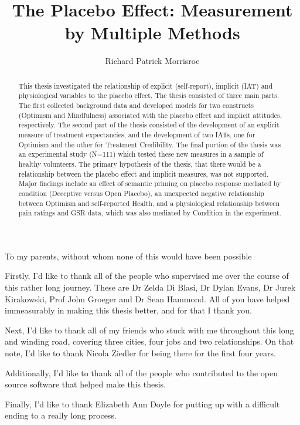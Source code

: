 \documentclass[apsych,phd]{uccthesis}
\title{The Placebo Effect: Measurement by Multiple Methods}
\author[99473437]{Richard Patrick Morrisroe}
\begin{document}


\maketitle





\begin{dedication}
To my parents, without whom none of this would have been possible
\end{dedication}

\begin{abstract}
  This thesis investigated the relationship of explicit (self-report), implicit (IAT) and physiological variables to the placebo effect. The thesis consisted of three main parts. The first collected background data and developed models for two constructs (Optimism and Mindfulness) associated with the placebo effect and implicit attitudes, respectively. The second part of the thesis consisted of the development of an explicit measure of treatment expectancies, and the development of two IATs, one for Optimism and the other for Treatment Credibility. The final portion of the thesis was an experimental study (N=111) which tested these new measures in a sample of healthy volunteers. The primary hypothesis of the thesis, that there would be a relationship between the placebo effect and implicit measures, was not supported. Major findings include an effect of semantic priming on placebo response mediated by condition (Deceptive versus Open Placebo), an unexpected negative relationship between Optimism and self-reported Health, and a physiological relationship between pain ratings and GSR data, which was also mediated by Condition in the experiment. 
\end{abstract}

\begin{acknowledgements}
  Firstly, I'd like to thank all of the people who supervised me over the course of this rather long journey. These are Dr Zelda Di Blasi, Dr Dylan Evans, Dr Jurek Kirakowski, Prof John Groeger and Dr Sean Hammond. All of you have helped immeasurably in making this thesis better, and for that I thank you. 

Next, I'd like to thank all of my friends who stuck with me throughout this long and winding road, covering three cities, four jobs and two relationships. On that note, I'd like to thank Nicola Ziedler for being there for the first four years. 

Additionally, I'd like to thank all of the people who contributed to the open source software that helped make this thesis. 

Finally, I'd like to thank Elizabeth Ann Doyle for putting up with a difficult ending to a really long process. 
\end{acknowledgements}
\end{document}
